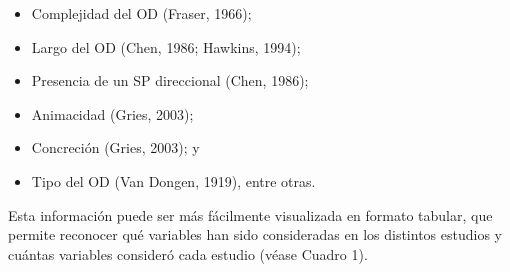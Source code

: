 \documentclass[authoryear,a4paper, 14pt]{scrartcl}
\begin{document}
\begin{itemize}
    \item
      Complejidad del OD (Fraser, 1966);
    \item
      Largo del OD (Chen, 1986; Hawkins, 1994);
    \item
      Presencia de un SP direccional (Chen, 1986);
    \item
      Animacidad (Gries, 2003);
    \item
      Concreción (Gries, 2003); y
    \item
      Tipo del OD (Van Dongen, 1919), entre otras.
\end{itemize}

Esta información puede ser más fácilmente visualizada en formato
tabular, que permite reconocer qué variables han sido consideradas en
los distintos estudios y cuántas variables consideró cada estudio (véase
Cuadro 1).
\end{document}
